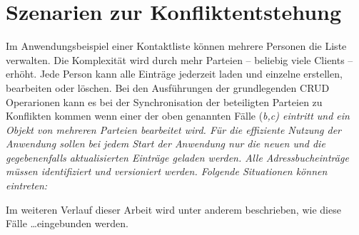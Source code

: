 \section{\label{sec:konfliktszenarien}Szenarien zur Konfliktentstehung}
Im Anwendungsbeispiel einer Kontaktliste können mehrere Personen die Liste verwalten. Die Komplexität wird durch mehr Parteien -- beliebig viele Clients -- erhöht.
Jede Person kann alle Einträge jederzeit laden und einzelne erstellen, bearbeiten oder löschen. Bei den Ausführungen der grundlegenden \gls{CRUD} Operarionen kann es bei der Synchronisation der beteiligten Parteien zu Konflikten kommen wenn einer der oben genannten Fälle (\it{b,c}) eintritt und ein Objekt von mehreren Parteien bearbeitet wird.
Für die effiziente Nutzung der Anwendung sollen bei jedem Start der Anwendung nur die neuen und die gegebenenfalls aktualisierten Einträge geladen werden. Alle Adressbucheinträge müssen identifiziert und versioniert werden. Folgende Situationen können eintreten:
%

%
Im weiteren Verlauf dieser Arbeit wird unter anderem beschrieben, wie diese Fälle \ldots eingebunden werden.
